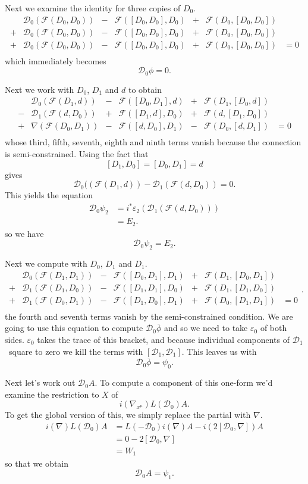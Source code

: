 \documentclass[twoside]{amsart}
\renewcommand{\epsilon}{\varepsilon}
\newcommand{\enm}[1]{\ensuremath{#1}}
\renewcommand{\bar}[1]{\overline{#1}}
\renewcommand{\epsilon}{\varepsilon}
\newcommand{\nab}{\enm{\nabla}}
\newcommand{\doc}{\enm{\mathcal{D}_{1}}}
\newcommand{\dzc}{\enm{\mathcal{D}_{0}}}
\newcommand{\ff}{\enm{\mathcal{F}}}
\newcommand{\bianchioddoddeven}[6]{
    \begin{array}{ccccccc}
           & {#4}(\ff({#2}, {#3}))& - &
             \ff([{#1},{#2}], {#3}) & + &
             \ff({#2}, [{#1},{#3}]) & \\
        - & {#5}(\ff({#3}, {#1}))& + &
             \ff([{#2},{#3}], {#1}) & + &
             \ff({#3}, [{#2},{#1}]) & \\
        + & {#6}(\ff({#1}, {#2}))& - &
             \ff([{#3},{#1}], {#2}) & - &
             \ff({#1}, [{#3},{#2}]) & =0\\
    \end{array}
}
\newcommand{\bianchioddoddodd}[6]{
    \begin{array}{ccccccc}
           & {#4}(\ff({#2}, {#3}))& - &
             \ff([{#1},{#2}], {#3}) & + &
             \ff({#2}, [{#1},{#3}]) & \\
        + & {#5}(\ff({#3}, {#1}))& - &
             \ff([{#2},{#3}], {#1}) & + &
             \ff({#3}, [{#2},{#1}]) & \\
        + & {#6}(\ff({#1}, {#2}))& - &
             \ff([{#3},{#1}], {#2}) & + &
             \ff({#1}, [{#3},{#2}]) & =0\\
    \end{array}
}
\begin{document}
Next we examine the identity for three copies of \( D_{0} \).
\[
\bianchioddoddodd{D_{0}}{D_{0}}{D_{0}}{\dzc}{\dzc}{\dzc}
\]
which immediately becomes
\begin{equation}
    \boxed{\dzc \phi = 0.}
    \label{eq:d0phi}
\end{equation}

Next we work with \( D_{0} \), \( D_{1} \) and \( d \) to obtain
\[
\bianchioddoddeven{D_{0}}{D_{1}}{d}{\dzc}{\doc}{\nab}
\]
whose third, fifth, seventh, eighth and ninth terms vanish because
the
connection is semi-constrained.  Using the fact that
\[ [D_{1},D_{0}] = [D_{0},D_{1}] = d \]
gives
\[ \dzc((\ff(D_{1}, d)) - \doc(\ff(d, D_{0})) = 0. \]
This yields the equation
\begin{align}
    \dzc \psi_{2} &= i^{*}
    \epsilon_{2}(\doc(\ff(d, D_{0}))) \nonumber\\
    &= E_{2}.
    \label{eq:q0psi2}
\end{align}
so we have
\begin{equation}\boxed{\dzc\psi_2=E_2.}\end{equation}

Next we compute with \( D_{0} \), \( D_{1} \) and \( D_{1} \).
\[
\bianchioddoddodd{D_{0}}{D_{1}}{D_{1}}{\dzc}{\doc}{\doc}.
\]
the fourth and seventh terms vanish by the semi-constrained
condition.  We are going to use this equation to compute \(
\dzc\bar{\phi}
\) and so we need to take \( \epsilon_{0} \) of both sides.  \(
\epsilon_{0} \)
takes the trace of this bracket, and because individual
components of \doc\ square to zero we kill the terms with \(
[\doc,\doc] \).  This leaves us with
\begin{equation}
    \boxed{\dzc\bar{\phi} = \psi_{0}.}
    \label{eq:d0phibar}
\end{equation}

Next let's work out \( \dzc A. \)  To compute a component
of this one-form we'd examine the restriction to \( X \) of
\[ i(\nab_{x^{\mu}}) L(\dzc)A. \]
To get the global version of this, we simply replace the partial with
\nab.
    \begin{align}
        i(\nab)L(\dzc)A &= L(-\dzc)i(\nab)A - i(2[\dzc,\nab])A \\
        &= 0 - 2[\dzc,\nab] \\
        &= W_{1}
    \end{align}
so that we obtain
\begin{equation}
    \boxed{\dzc A = \psi_{1}.}
    \label{eq:d0a}
\end{equation}
\end{document}
